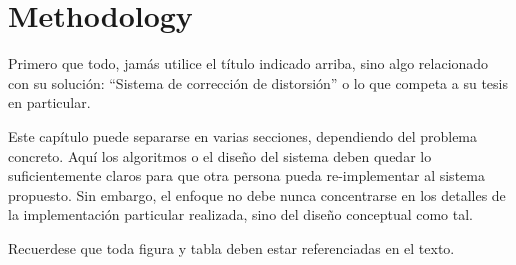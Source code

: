 \chapter{Methodology}
\label{ch:solucion}

Primero que todo, jamás utilice el título indicado arriba, sino algo
relacionado con su solución: ``Sistema de corrección de distorsión'' o lo que
competa a su tesis en particular.

Este capítulo puede separarse en varias secciones, dependiendo del problema
concreto. Aquí los algoritmos o el diseño del sistema deben quedar lo
suficientemente claros para que otra persona pueda re-implementar al sistema
propuesto. Sin embargo, el enfoque no debe nunca concentrarse en los detalles
de la implementación particular realizada, sino del diseño conceptual como tal.

Recuerdese que toda figura y tabla deben estar referenciadas en el texto.
